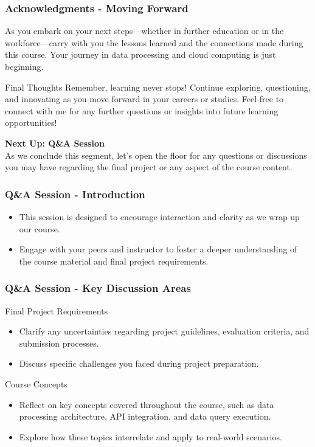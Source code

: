 \documentclass[aspectratio=169]{beamer}
\begin{document}
\begin{frame}[fragile]
    \frametitle{Acknowledgments - Moving Forward}
    As you embark on your next steps—whether in further education or in the workforce—carry with you the lessons learned and the connections made during this course. Your journey in data processing and cloud computing is just beginning.

    \begin{block}{Final Thoughts}
    Remember, learning never stops! Continue exploring, questioning, and innovating as you move forward in your careers or studies. Feel free to connect with me for any further questions or insights into future learning opportunities!
    \end{block}
    
    \textbf{Next Up: Q\&A Session} \\
    As we conclude this segment, let’s open the floor for any questions or discussions you may have regarding the final project or any aspect of the course content.
\end{frame}

\begin{frame}[fragile]
    \frametitle{Q\&A Session - Introduction}
    \begin{itemize}
        \item This session is designed to encourage interaction and clarity as we wrap up our course.
        \item Engage with your peers and instructor to foster a deeper understanding of the course material and final project requirements.
    \end{itemize}
\end{frame}

\begin{frame}[fragile]
    \frametitle{Q\&A Session - Key Discussion Areas}
    \begin{block}{Final Project Requirements}
        \begin{itemize}
            \item Clarify any uncertainties regarding project guidelines, evaluation criteria, and submission processes.
            \item Discuss specific challenges you faced during project preparation.
        \end{itemize}
    \end{block}
    \begin{block}{Course Concepts}
        \begin{itemize}
            \item Reflect on key concepts covered throughout the course, such as data processing architecture, API integration, and data query execution.
            \item Explore how these topics interrelate and apply to real-world scenarios.
        \end{itemize}
    \end{block}
\end{frame}
\end{document}
